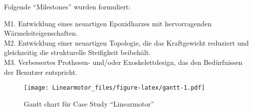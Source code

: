 \documentclass[
  oneside]{book}
\begin{document}
Folgende ``Milestones'' wurden formuliert:

M1. Entwicklung eines neuartigen Epoxidharzes mit hervorragenden Wärmeleiteigenschaften.\\
M2. Entwicklung einer neuartigen Topologie, die das Kraftgewicht reduziert und gleichzeitig die strukturelle Steifigkeit beibehält.\\
M3. Verbessertes Prothesen- und/oder Exoskelettdesign, das den Bedürfnissen der Benutzer entspricht.

\begin{figure}
\centering
\texttt{[image: Linearmotor\_files/figure-latex/gantt-1.pdf]}
\caption{\label{fig:gantt}Gantt chart für Case Study ``Linearmotor''}
\end{figure}

  
\end{document}
